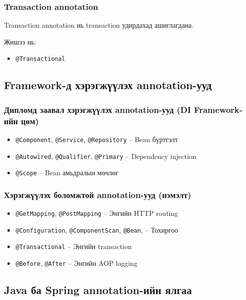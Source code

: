 \subsubsection{Transaction annotation}

Transaction annotation нь transaction удирдахад ашиглагдана.

Жишээ нь:
\begin{itemize}
    \item \texttt{@Transactional}
\end{itemize}

\newpage
\subsection{Framework-д хэрэгжүүлэх annotation-ууд}

\subsubsection{Дипломд заавал хэрэгжүүлэх annotation-ууд (DI Framework-ийн цөм)}

\begin{itemize}
    \item \texttt{@Component}, \texttt{@Service}, \texttt{@Repository} -- Bean бүртгэлт
    \item \texttt{@Autowired}, \texttt{@Qualifier}, \texttt{@Primary} -- Dependency injection
    \item \texttt{@Scope} -- Bean амьдралын мөчлөг
\end{itemize}

\subsubsection{Хэрэгжүүлэх боломжтой annotation-ууд (нэмэлт)}

\begin{itemize}
    \item \texttt{@GetMapping}, \texttt{@PostMapping} -- Энгийн HTTP routing
    \item \texttt{@Configuration},  \texttt{@ComponentScan}, \texttt{@Bean}, -- Тохиргоо
    \item \texttt{@Transactional} -- Энгийн transaction
    \item \texttt{@Before}, \texttt{@After} -- Энгийн AOP logging
\end{itemize}

\subsection{Java ба Spring annotation-ийн ялгаа}

